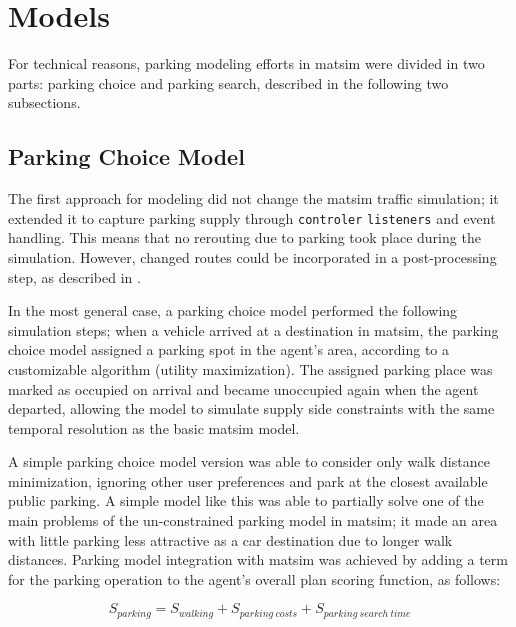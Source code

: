 \section{Models}
For technical reasons, parking modeling efforts in \gls{matsim} were divided in two parts: parking choice and parking search, described in the following two subsections. 

\subsection{Parking Choice Model}
The first approach for modeling did not change the \gls{matsim} traffic simulation; it extended it to capture parking supply through \lstinline|controler| \lstinline|listeners| and event handling. This means that no rerouting due to parking took place during the simulation. However, changed routes could be incorporated in a post-processing step, as described in \citet[][]{WaraichAxhausen_TRR_2012}. 

In the most general case, a parking choice model performed the following simulation steps; when a vehicle arrived at a destination in \gls{matsim}, the parking choice model assigned a parking spot in the agent's area, according to a customizable algorithm (\eg utility maximization). The assigned parking place was marked as occupied on arrival and became unoccupied again when the agent departed, allowing the model to simulate supply side constraints with the same temporal resolution as the basic \gls{matsim} model.

A simple parking choice model version was able to consider only walk distance minimization, ignoring other user preferences and park at the closest available public parking. A simple model like this was able to partially solve one of the main problems of the un-constrained parking model in \gls{matsim}; it made an area with little parking less attractive as a car destination due to longer walk distances. Parking model integration with \gls{matsim} was achieved by adding a term for the parking operation to the agent’s overall plan scoring function, as follows:

\begin{equation}
\label{eq:parkingutf}
S_{parking} = S_{walking} + S_{parking\ costs} + S_{parking\ search\ time}
\end{equation}

